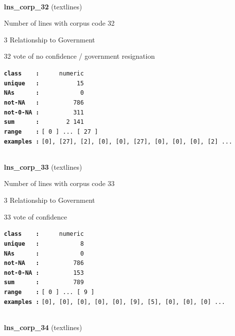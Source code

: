 \documentclass[]{article}
\begin{document}
~

\textbf{lns\_corp\_32} (textlines)

Number of lines with corpus code 32

3 Relationship to Government

32 vote of no confidence / government resignation

\textbf{\texttt{class\ \ \ \ :}} \texttt{~~~~~numeric}\\
\textbf{\texttt{unique\ \ \ :}} \texttt{~~~~~~~~~~15}\\
\textbf{\texttt{NAs\ \ \ \ \ \ :}} \texttt{~~~~~~~~~~~0}\\
\textbf{\texttt{not-NA\ \ \ :}} \texttt{~~~~~~~~~786}\\
\textbf{\texttt{not-0-NA\ :}} \texttt{~~~~~~~~~311}\\
\textbf{\texttt{sum\ \ \ \ \ \ :}} \texttt{~~~~~~~2~141}\\
\textbf{\texttt{range\ \ \ \ :}}
\texttt{{[}\ 0\ {]}\ ...\ {[}\ 27\ {]}}\\
\textbf{\texttt{examples\ :}}
\texttt{{[}0{]},\ {[}27{]},\ {[}2{]},\ {[}0{]},\ {[}0{]},\ {[}27{]},\ {[}0{]},\ {[}0{]},\ {[}0{]},\ {[}2{]}\ ...}\\

~

\textbf{lns\_corp\_33} (textlines)

Number of lines with corpus code 33

3 Relationship to Government

33 vote of confidence

\textbf{\texttt{class\ \ \ \ :}} \texttt{~~~~~numeric}\\
\textbf{\texttt{unique\ \ \ :}} \texttt{~~~~~~~~~~~8}\\
\textbf{\texttt{NAs\ \ \ \ \ \ :}} \texttt{~~~~~~~~~~~0}\\
\textbf{\texttt{not-NA\ \ \ :}} \texttt{~~~~~~~~~786}\\
\textbf{\texttt{not-0-NA\ :}} \texttt{~~~~~~~~~153}\\
\textbf{\texttt{sum\ \ \ \ \ \ :}} \texttt{~~~~~~~~~789}\\
\textbf{\texttt{range\ \ \ \ :}}
\texttt{{[}\ 0\ {]}\ ...\ {[}\ 9\ {]}}\\
\textbf{\texttt{examples\ :}}
\texttt{{[}0{]},\ {[}0{]},\ {[}0{]},\ {[}0{]},\ {[}0{]},\ {[}9{]},\ {[}5{]},\ {[}0{]},\ {[}0{]},\ {[}0{]}\ ...}\\

~

\textbf{lns\_corp\_34} (textlines)
\end{document}
